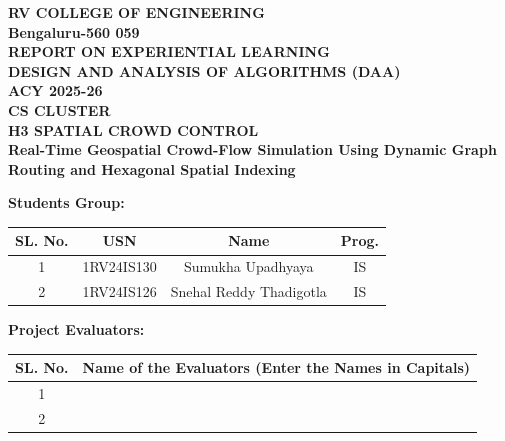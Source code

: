 \documentclass[12pt,a4paper,oneside]{report}
\begin{document}
\begin{titlepage}
    \thispagestyle{titlepage}
    \begin{center}
        \vspace*{0.5cm}
        \Large\textbf{RV COLLEGE OF ENGINEERING} \\
        \large\textbf{Bengaluru-560 059} \\
        \vspace{1.2cm}
        \Large\textbf{REPORT ON EXPERIENTIAL LEARNING} \\
        \large\textbf{DESIGN AND ANALYSIS OF ALGORITHMS (DAA)} \\
        \large\textbf{ACY 2025-26} \\
        \vspace{0.8cm}
        \Large\textbf{CS CLUSTER} \\
        \vspace{1.0cm}
        \Huge\textbf{H3 SPATIAL CROWD CONTROL} \\[0.4cm]
        \large\textbf{Real-Time Geospatial Crowd-Flow Simulation Using Dynamic Graph Routing and Hexagonal Spatial Indexing} \\
        \vspace{1.0cm}
        
        \large\textbf{Students Group:} \\
        \vspace{0.3cm}
        \small
        \begin{tabular}{|c|c|c|c|}
            \hline
            \textbf{SL. No.} & \textbf{USN} & \textbf{Name} & \textbf{Prog.} \\
            \hline
            1 & 1RV24IS130 & Sumukha Upadhyaya & IS \\
            \hline
            2 & 1RV24IS126 & Snehal Reddy Thadigotla & IS \\
            \hline
        \end{tabular}
        
        \vspace{1.2cm}
        \large\textbf{Project Evaluators:} \\
        \vspace{0.3cm}
        \small
        \begin{tabular}{|c|p{8cm}|}
            \hline
            \textbf{SL. No.} & \textbf{Name of the Evaluators (Enter the Names in Capitals)} \\
            \hline
            1 & \\
            \hline
            2 & \\
            \hline
        \end{tabular}
        

\end{center}
\end{titlepage}
\end{document}
